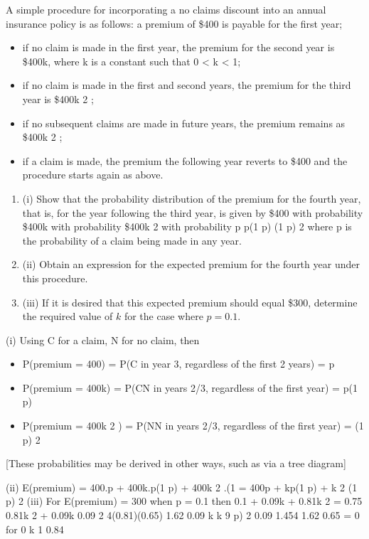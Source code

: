 \documentclass[a4paper,12pt]{article}
\begin{document}

A simple procedure for incorporating a no claims discount into an annual insurance policy is as follows:
a premium of \$400 is payable for the first year;
\begin{itemize}
\item if no claim is made in the first year, the premium for the second year is \$400k,
where k is a constant such that 0 < k < 1;
\item if no claim is made in the first and second years, the premium for the third
year is \$400k 2 ;
\item if no subsequent claims are made in future years, the premium remains as
\$400k 2 ;
\item if a claim is made, the premium the following year reverts to \$400 and the
procedure starts again as above.
\end{itemize}

\begin{enumerate}
    \item (i)
Show that the probability distribution of the premium for the fourth year, that is, for the year following the third year, is given by
\$400
with probability
\$400k with probability
\$400k 2 with probability
p
p(1 p)
(1 p) 2
where p is the probability of a claim being made in any year.

\item (ii) Obtain an expression for the expected premium for the fourth year under this procedure.
\item (iii) If it is desired that this expected premium should equal \$300, determine the required value of $k$ for the case where $p = 0.1$.

\end{enumerate}


(i) Using C for a claim, N for no claim, then
\begin{itemize}
\item P(premium = 400) = P(C in year 3, regardless of the first 2 years) = p
\item P(premium = 400k) = P(CN in years 2/3, regardless of the first year) = p(1 p)
\item P(premium = 400k 2 ) = P(NN in years 2/3, regardless of the first year) = (1 p) 2
\end{itemize}
[These probabilities may be derived in other ways, such as via a tree diagram]

(ii) E(premium) = 400.p + 400k.p(1 p) + 400k 2 .(1
= 400{p + kp(1 p) + k 2 (1 p) 2 }
(iii) For E(premium) = 300 when p = 0.1
then 0.1 + 0.09k + 0.81k 2 = 0.75
0.81k 2 + 0.09k
0.09 2 4(0.81)(0.65)
1.62
0.09
k
k
9
p) 2
0.09 1.454
1.62
0.65 = 0
for 0 k 1
0.84

\end{document}
